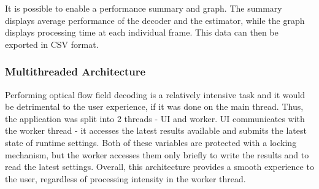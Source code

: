 \documentclass[11pt,english]{report}
\begin{document}
It is possible to enable a performance summary and graph. The summary displays average performance of the decoder and the estimator, while the graph displays processing time at each individual frame. This data can then be exported in CSV format.

\subsubsection{Multithreaded Architecture}

Performing optical flow field decoding is a relatively intensive task and it would be detrimental to the user experience, if it was done on the main thread. Thus, the application was split into 2 threads - UI and worker. UI communicates with the worker thread - it accesses the latest results available and submits the latest state of runtime settings. Both of these variables are protected with a locking mechanism, but the worker accesses them only briefly to write the results and to read the latest settings. Overall, this architecture provides a smooth experience to the user, regardless of processing intensity in the worker thread.
\end{document}
